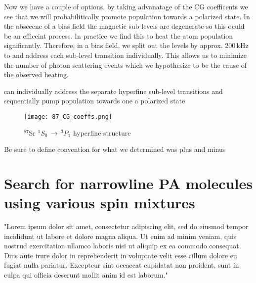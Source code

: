 Now we have a couple of options, by taking advanatage of the CG coefficents we see that we will probabilitically promote population towards a polarized state.
In the absecene of a bias field the magnetic sub-levels are degenerate so this oculd be an efficeint process.
In practice we find this to heat the atom population significantly.
Therefore, in a bias field, we split out the levels by approx. 200\,kHz to and address each sub-level transition individually.
This allows us to minimize the number of photon scattering events which we hypothesize to be the cause of the observed heating.

can individually address the separate hyperfine sub-level transitions and sequentially pump population towards one a polarized state 
	\begin{figure}
		\centerline{
		\texttt{[image: 87\_CG\_coeffs.png]}}
		\caption{$^{87}$Sr $^1S_0 \, \rightarrow \, ^3P_1$ hyperfine structure}
		\label{fig:mF87}
	\end{figure} 
	
Be sure to define convention for what we determined was plus and minus

\section{Search for narrowline PA molecules using various spin mixtures}
\label{sec:87PAS}

"Lorem ipsum dolor sit amet, consectetur adipiscing elit, sed do eiusmod tempor incididunt ut labore et dolore magna aliqua. Ut enim ad minim veniam, quis nostrud exercitation ullamco laboris nisi ut aliquip ex ea commodo consequat. Duis aute irure dolor in reprehenderit in voluptate velit esse cillum dolore eu fugiat nulla pariatur. Excepteur sint occaecat cupidatat non proident, sunt in culpa qui officia deserunt mollit anim id est laborum."
